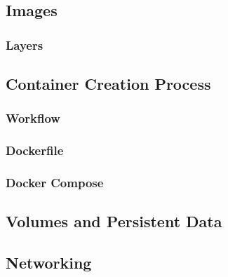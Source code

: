 \subsection{Images}
\label{sec::arch:images}


\subsubsection{Layers}

\subsection{Container Creation Process}
\label{sec::arch:cont-creation}
\subsubsection{Workflow}
\subsubsection{Dockerfile}
\subsubsection{Docker Compose}

\subsection{Volumes and Persistent Data}
\label{sec::arch:volumes}

\subsection{Networking}
\label{sec::arch:net}